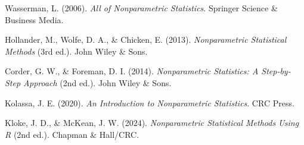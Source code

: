 \documentclass{arabicClass}
\begin{document}
	
	\amirifont
	
	
	
	\arabicfont
\tableofcontents
\clearpage
{}



	
	
	
	
	
	

	\begin{thebibliography}{9}
		\begin{english}
		Wasserman, L. (2006).
		\textit{All of Nonparametric Statistics}.
		Springer Science \& Business Media.
		
		Hollander, M., Wolfe, D. A., \& Chicken, E. (2013).
		\textit{Nonparametric Statistical Methods} (3rd ed.).
		John Wiley \& Sons.
		
		Corder, G. W., \& Foreman, D. I. (2014).
		\textit{Nonparametric Statistics: A Step-by-Step Approach} (2nd ed.).
		John Wiley \& Sons.
		
		Kolassa, J. E. (2020).
		\textit{An Introduction to Nonparametric Statistics}.
		CRC Press.
		
		Kloke, J. D., \& McKean, J. W. (2024).
		\textit{Nonparametric Statistical Methods Using R} (2nd ed.).
		Chapman \& Hall/CRC.
	\end{english}
	\end{thebibliography}

	
   
\end{document}
